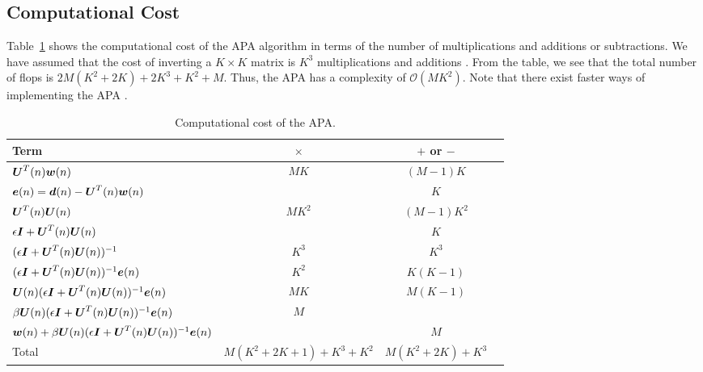 \subsection{Computational Cost}
Table~\ref{tab:comp_cost_apa} shows the computational cost of the APA algorithm in terms of the number of multiplications and additions or subtractions. We have assumed that the cost of inverting a $K\times K$ matrix is $K^3$ multiplications and additions \cite[p.~240]{Sayed2003}. From the table, we see that the total number of flops is $2M(K^2+2K)+2K^3+K^2+M$. Thus, the APA has a complexity of $\mathcal{O}(MK^2)$. Note that there exist faster ways of implementing the APA \cite[pp.~339-340]{Haykin2001}.
\begin{table}[htbp]
  \centering
  \begin{tabular}{@{}l c c c@{}}
    \toprule
    Term & $\times$ & $+$ or $-$ \\
    \midrule
    $\boldsymbol{U}^T(n)\boldsymbol{w}(n)$ & $MK$ & $(M-1)K$ \\
    $\boldsymbol{e}(n)=\boldsymbol{d}(n)-\boldsymbol{U}^T(n)\boldsymbol{w}(n)$ & & $K$ \\
    $\boldsymbol{U}^T(n)\boldsymbol{U}(n)$ & $MK^2$ & $(M-1)K^2$ \\
    $\epsilon\boldsymbol{I}+\boldsymbol{U}^T(n)\boldsymbol{U}(n)$ & & $K$ \\
    $(\epsilon\boldsymbol{I}+\boldsymbol{U}^T(n)\boldsymbol{U}(n))^{-1}$ & $K^3$ & $K^3$ \\
    $(\epsilon\boldsymbol{I}+\boldsymbol{U}^T(n)\boldsymbol{U}(n))^{-1}\boldsymbol{e}(n)$ & $K^2$ & $K(K-1)$ \\
    $\boldsymbol{U}(n)(\epsilon\boldsymbol{I}+\boldsymbol{U}^T(n)\boldsymbol{U}(n))^{-1}\boldsymbol{e}(n)$ & $MK$ & $M(K-1)$ \\
    $\beta\boldsymbol{U}(n)(\epsilon\boldsymbol{I}+\boldsymbol{U}^T(n)\boldsymbol{U}(n))^{-1}\boldsymbol{e}(n)$ & $M$ &  \\
    $\boldsymbol{w}(n)+\beta\boldsymbol{U}(n)(\epsilon\boldsymbol{I}+\boldsymbol{U}^T(n)\boldsymbol{U}(n))^{-1}\boldsymbol{e}(n)$ &  & $M$\\
    \midrule
    Total & $M(K^2+2K+1)+K^3+K^2$ & $M(K^2+2K)+K^3$\\
    \bottomrule
  \end{tabular}
  \caption{Computational cost of the APA.}
  \label{tab:comp_cost_apa}
\end{table}
